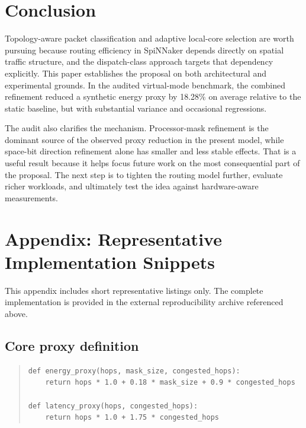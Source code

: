 \documentclass[11pt]{article}
\begin{document}
\section{Conclusion}
Topology-aware packet classification and adaptive local-core selection are worth pursuing because routing efficiency in SpiNNaker depends directly on spatial traffic structure, and the dispatch-class approach targets that dependency explicitly. This paper establishes the proposal on both architectural and experimental grounds. In the audited virtual-mode benchmark, the combined refinement reduced a synthetic energy proxy by 18.28\% on average relative to the static baseline, but with substantial variance and occasional regressions.

The audit also clarifies the mechanism. Processor-mask refinement is the dominant source of the observed proxy reduction in the present model, while space-bit direction refinement alone has smaller and less stable effects. That is a useful result because it helps focus future work on the most consequential part of the proposal. The next step is to tighten the routing model further, evaluate richer workloads, and ultimately test the idea against hardware-aware measurements.

\appendix
\section{Appendix: Representative Implementation Snippets}
This appendix includes short representative listings only. The complete implementation is provided in the external reproducibility archive referenced above.

\subsection{Core proxy definition}
\begin{quote}
\begin{verbatim}
def energy_proxy(hops, mask_size, congested_hops):
    return hops * 1.0 + 0.18 * mask_size + 0.9 * congested_hops

def latency_proxy(hops, congested_hops):
    return hops * 1.0 + 1.75 * congested_hops
\end{verbatim}
\end{quote}
\end{document}

